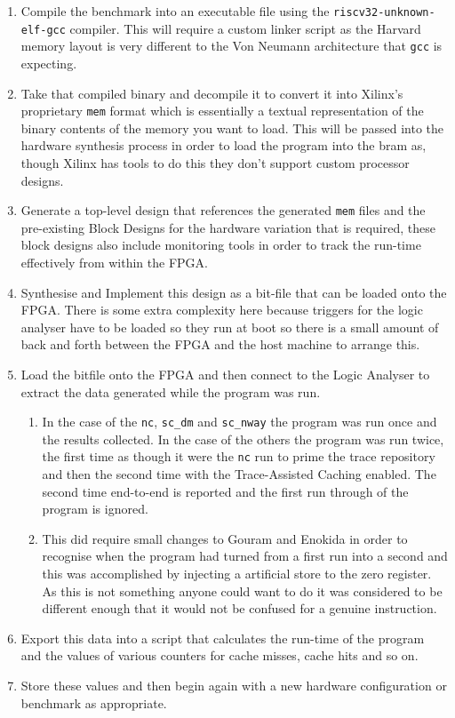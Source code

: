 \begin{enumerate}
	\item Compile the benchmark into an executable file using the \texttt{riscv32-unknown-elf-gcc} compiler. This will require a custom linker script as the Harvard memory layout is very different to the Von Neumann architecture that \texttt{gcc} is expecting.
	\item Take that compiled binary and decompile it to convert it into Xilinx's proprietary \texttt{mem} format which is essentially a textual representation of the binary contents of the memory you want to load. This will be passed into the hardware synthesis process in order to load the program into the \gls{bram} as, though Xilinx has tools to do this they don't support custom processor designs.
	\item Generate a top-level design that references the generated \texttt{mem} files and the pre-existing Block Designs for the hardware variation that is required, these block designs also include monitoring tools in order to track the run-time effectively from within the FPGA.
	\item Synthesise and Implement this design as a bit-file that can be loaded onto the FPGA. There is some extra complexity here because triggers for the logic analyser have to be loaded so they run at boot so there is a small amount of back and forth between the FPGA and the host machine to arrange this.
	\item Load the bitfile onto the FPGA and then connect to the Logic Analyser to extract the data generated while the program was run.
	\begin{enumerate}
		\item In the case of the \texttt{nc}, \texttt{sc\_dm} and \texttt{sc\_nway} the program was run once and the results collected. In the case of the others the program was run twice, the first time as though it were the \texttt{nc} run to prime the trace repository and then the second time with the Trace-Assisted Caching enabled. The second time end-to-end is reported and the first run through of the program is ignored.
		\item This did require small changes to Gouram and Enokida in order to recognise when the program had turned from a first run into a second and this was accomplished by injecting a artificial store to the zero register. As this is not something anyone could want to do it was considered to be different enough that it would not be confused for a genuine instruction.
	\end{enumerate}
	\item Export this data into a script that calculates the run-time of the program and the values of various counters for cache misses, cache hits and so on.
	\item Store these values and then begin again with a new hardware configuration or benchmark as appropriate. 
\end{enumerate}

